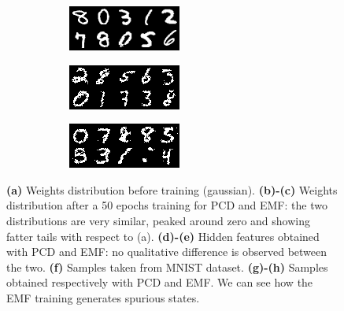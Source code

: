 \documentclass[notitlepage]{revtex4-1}
\begin{document}
\begin{figure}
\begin{subfigure}{.25\linewidth}
    \caption{} 
    \label{fig:features_tap}
  \end{subfigure}
  \begin{subfigure}{.25\linewidth}
  	\begin{subfigure}{.5\linewidth}
  		\includegraphics[width=\linewidth]{samples.png}
        \caption{} 
        \label{fig:samples_mnist}
  	\end{subfigure}
  	\begin{subfigure}{.5\linewidth}
  		\includegraphics[width=\linewidth]{samples_pcd.png}
        \caption{} 
        \label{fig:samples_pcd}
  	\end{subfigure}
  	\begin{subfigure}{.5\linewidth}
  		\includegraphics[width=\linewidth]{samples_tap.png}
        \caption{} 
        \label{fig:samples_tap}
  	\end{subfigure}
  \end{subfigure}
  
 \caption{\textbf{(a)} Weights distribution before training (gaussian). \textbf{(b)-(c)} Weights distribution after a 50 epochs training for PCD and EMF: the two distributions are very similar, peaked around zero and showing fatter tails with respect to (a). \textbf{(d)-(e)} Hidden features obtained with PCD and EMF: no qualitative difference is observed between the two. \textbf{(f)} Samples taken from MNIST dataset. \textbf{(g)-(h)} Samples obtained respectively with PCD and EMF. We can see how the EMF training generates spurious states.}
\end{figure}
\end{document}
